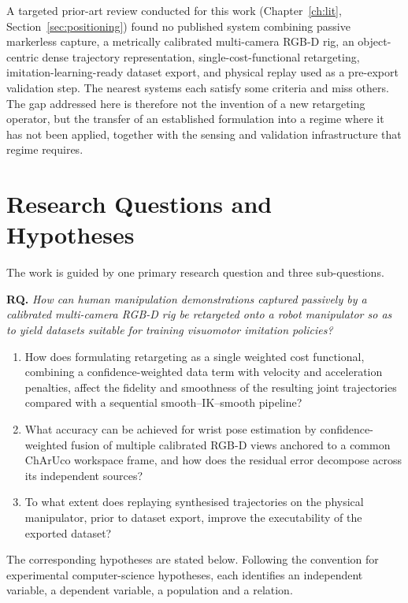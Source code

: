 A targeted prior-art review conducted for this work (Chapter~\ref{ch:lit},
Section~\ref{sec:positioning}) found no published system combining passive
markerless capture, a metrically calibrated multi-camera RGB-D rig, an
object-centric dense trajectory representation, single-cost-functional
retargeting, imitation-learning-ready dataset export, and physical replay used
as a pre-export validation step. The nearest systems each satisfy some criteria
and miss others. The gap addressed here is therefore not the invention of a new
retargeting operator, but the transfer of an established formulation into a
regime where it has not been applied, together with the sensing and validation
infrastructure that regime requires.

\section{Research Questions and Hypotheses}
\label{sec:rq}

The work is guided by one primary research question and three sub-questions.

\vspace{2mm}
\noindent\textbf{RQ.} \emph{How can human manipulation demonstrations captured
passively by a calibrated multi-camera RGB-D rig be retargeted onto a robot
manipulator so as to yield datasets suitable for training visuomotor imitation
policies?}

\begin{enumerate}[label=\textbf{RQ\arabic*.}, leftmargin=2.2em]
  \item How does formulating retargeting as a single weighted cost functional,
        combining a confidence-weighted data term with velocity and
        acceleration penalties, affect the fidelity and smoothness of the
        resulting joint trajectories compared with a sequential
        smooth--IK--smooth pipeline?
  \item What accuracy can be achieved for wrist pose estimation by
        confidence-weighted fusion of multiple calibrated RGB-D views anchored
        to a common ChArUco workspace frame, and how does the residual error
        decompose across its independent sources?
  \item To what extent does replaying synthesised trajectories on the physical
        manipulator, prior to dataset export, improve the executability of the
        exported dataset?
\end{enumerate}

\noindent The corresponding hypotheses are stated below. Following the
convention for experimental computer-science hypotheses, each identifies an
independent variable, a dependent variable, a population and a relation.


